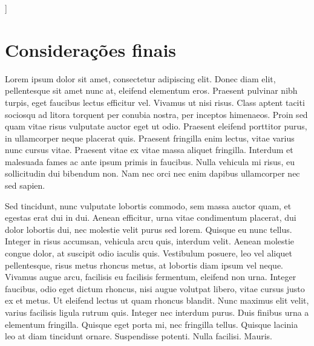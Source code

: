 \documentclass[
	article,			%
	11pt,				%
	oneside,			%
	a4paper,			%
	english,			%
	brazil,				%
	sumario=tradicional
	]{abntex2}
\begin{document}
]  			%

\textual










% 

\section*{Considerações finais}


Lorem ipsum dolor sit amet, consectetur adipiscing elit. Donec diam elit, pellentesque sit amet nunc at, eleifend elementum eros. Praesent pulvinar nibh turpis, eget faucibus lectus efficitur vel. Vivamus ut nisi risus. Class aptent taciti sociosqu ad litora torquent per conubia nostra, per inceptos himenaeos. Proin sed quam vitae risus vulputate auctor eget ut odio. Praesent eleifend porttitor purus, in ullamcorper neque placerat quis. Praesent fringilla enim lectus, vitae varius nunc cursus vitae. Praesent vitae ex vitae massa aliquet fringilla. Interdum et malesuada fames ac ante ipsum primis in faucibus. Nulla vehicula mi risus, eu sollicitudin dui bibendum non. Nam nec orci nec enim dapibus ullamcorper nec sed sapien.

Sed tincidunt, nunc vulputate lobortis commodo, sem massa auctor quam, et egestas erat dui in dui. Aenean efficitur, urna vitae condimentum placerat, dui dolor lobortis dui, nec molestie velit purus sed lorem. Quisque eu nunc tellus. Integer in risus accumsan, vehicula arcu quis, interdum velit. Aenean molestie congue dolor, at suscipit odio iaculis quis. Vestibulum posuere, leo vel aliquet pellentesque, risus metus rhoncus metus, at lobortis diam ipsum vel neque. Vivamus augue arcu, facilisis eu facilisis fermentum, eleifend non urna. Integer faucibus, odio eget dictum rhoncus, nisi augue volutpat libero, vitae cursus justo ex et metus. Ut eleifend lectus ut quam rhoncus blandit. Nunc maximus elit velit, varius facilisis ligula rutrum quis. Integer nec interdum purus. Duis finibus urna a elementum fringilla. Quisque eget porta mi, nec fringilla tellus. Quisque lacinia leo at diam tincidunt ornare. Suspendisse potenti. Nulla facilisi. Mauris. 
\end{document}
